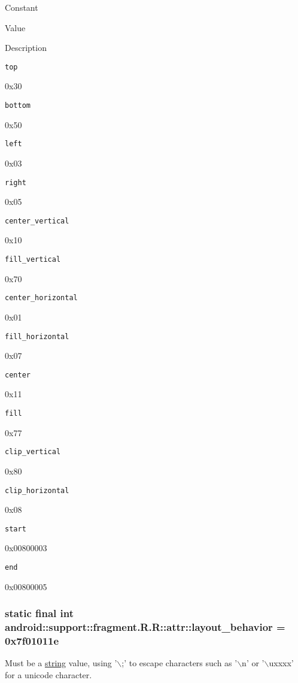 Constant

Value

Description 

{\tt top}

0x30

{\tt bottom}

0x50

{\tt left}

0x03

{\tt right}

0x05

{\tt center\_\-vertical}

0x10

{\tt fill\_\-vertical}

0x70

{\tt center\_\-horizontal}

0x01

{\tt fill\_\-horizontal}

0x07

{\tt center}

0x11

{\tt fill}

0x77

{\tt clip\_\-vertical}

0x80

{\tt clip\_\-horizontal}

0x08

{\tt start}

0x00800003

{\tt end}

0x00800005\hypertarget{classandroid_1_1support_1_1fragment_1_1_r_1_1attr_d9b88ed512a061a47f7e3e021625f67f}{
\subsubsection[{layout\_\-behavior}]{\setlength{\rightskip}{0pt plus 5cm}static final int android::support::fragment.R.R::attr::layout\_\-behavior = 0x7f01011e}}
\label{classandroid_1_1support_1_1fragment_1_1_r_1_1attr_d9b88ed512a061a47f7e3e021625f67f}


Must be a \hyperlink{classandroid_1_1support_1_1fragment_1_1_r_1_1string}{string} value, using '$\backslash$;' to escape characters such as '$\backslash$n' or '$\backslash$uxxxx' for a unicode character. 


